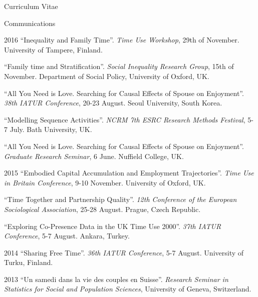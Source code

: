 \documentclass[12pt,a4paper]{article}
\begin{document}
\begin{cv}{Curriculum Vitae}
\begin{cvlist}{Communications}
	 \item[2016]  ``Inequality and Family Time''. \emph{Time Use Workshop}, 29th of November. University of Tampere, Finland. 
	 
	 \item[]  ``Family time and Stratification''. \emph{Social Inequality Research Group}, 15th of November. Department of Social Policy, University of Oxford, UK.  
	 
	 \item[]  ``All You Need is Love. Searching for Causal Effects of Spouse on Enjoyment''. \emph{38th IATUR Conference}, 20-23 August. Seoul University, South Korea. 
	 
	 \item[]  ``Modelling Sequence Activities''. \emph{NCRM 7th ESRC Research Methods Festival}, 5-7 July. Bath University, UK. 
	 
	  \item[]  ``All You Need is Love. Searching for Causal Effects of Spouse on Enjoyment''. \emph{Graduate Research Seminar}, 6 June. Nuffield College, UK. 
	  
	   \item[2015]  ``Embodied Capital Accumulation and Employment Trajectories''. \emph{Time Use in Britain Conference}, 9-10 November. University of Oxford, UK.  
	   
	   	 \item[]  ``Time Together and Partnership Quality''. \emph{12th Conference of the European Sociological Association}, 25-28 August. Prague, Czech Republic.  
	   
	      \item[]  ``Exploring Co-Presence Data in the UK Time Use 2000''. \emph{37th IATUR Conference}, 5-7 August. Ankara, Turkey.  
	      
	       \item[2014]  ``Sharing Free Time''. \emph{36th IATUR Conference}, 5-7 August. University of Turku, Finland.  
	        
	        \item[2013] ``Un samedi dans la vie des couples en Suisse''. \emph{Research Seminar in Statistics for Social and Population Sciences}, University of Geneva, Switzerland. 
	        \end{cvlist}



  \date{~August~2019}
\end{cv}
\end{document}
